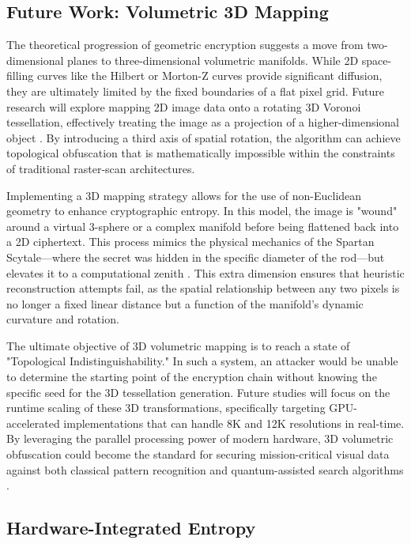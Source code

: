 \documentclass[12pt,fleqn]{article}
\begin{document}
\subsection{Future Work: Volumetric 3D Mapping}

The theoretical progression of geometric encryption suggests a move from two-dimensional planes to three-dimensional volumetric manifolds. While 2D space-filling curves like the Hilbert or Morton-Z curves provide significant diffusion, they are ultimately limited by the fixed boundaries of a flat pixel grid. Future research will explore mapping 2D image data onto a rotating 3D Voronoi tessellation, effectively treating the image as a projection of a higher-dimensional object \cite{bader2012space}. By introducing a third axis of spatial rotation, the algorithm can achieve topological obfuscation that is mathematically impossible within the constraints of traditional raster-scan architectures.

Implementing a 3D mapping strategy allows for the use of non-Euclidean geometry to enhance cryptographic entropy. In this model, the image is "wound" around a virtual 3-sphere or a complex manifold before being flattened back into a 2D ciphertext. This process mimics the physical mechanics of the Spartan Scytale—where the secret was hidden in the specific diameter of the rod—but elevates it to a computational zenith \cite{kelly2011scytale}. This extra dimension ensures that heuristic reconstruction attempts fail, as the spatial relationship between any two pixels is no longer a fixed linear distance but a function of the manifold’s dynamic curvature and rotation.

The ultimate objective of 3D volumetric mapping is to reach a state of "Topological Indistinguishability." In such a system, an attacker would be unable to determine the starting point of the encryption chain without knowing the specific seed for the 3D tessellation generation. Future studies will focus on the runtime scaling of these 3D transformations, specifically targeting GPU-accelerated implementations that can handle 8K and 12K resolutions in real-time. By leveraging the parallel processing power of modern hardware, 3D volumetric obfuscation could become the standard for securing mission-critical visual data against both classical pattern recognition and quantum-assisted search algorithms \cite{montanaro2016quantum}.

\subsection{Hardware-Integrated Entropy}
\end{document}
